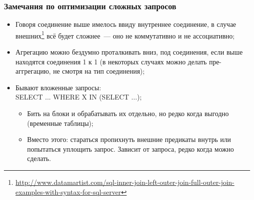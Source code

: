 \documentclass{beamer}
\begin{document}
\begin{frame}
\frametitle{Замечания по оптимизации сложных запросов}

\begin{itemize}
  \item Говоря соединение выше имелось ввиду внутреннее соединение, в случае внешних\footnote{\url{http://www.datamartist.com/sql-inner-join-left-outer-join-full-outer-join-examples-with-syntax-for-sql-server}} всё будет сложнее~--- оно не коммутативно и не ассоциативно;
  \item Агрегацию можно бездумно проталкивать вниз, под соединения, если выше находятся соединения 1 к 1 (в некоторых случаях можно делать пре-аггрегацию, не смотря на тип соединения);
  \item Бывают вложенные запросы:\\ SELECT ... WHERE X IN (SELECT ...);
  \begin{itemize}
    \item Бить на блоки и обрабатывать их отдельно, но редко когда выгодно (временные таблицы);
    \item Вместо этого: стараться пропихнуть внешние предикаты внутрь или попытаться уплощить запрос. Зависит от запроса, редко когда можно сделать.
  \end{itemize}
\end{itemize}

\end{frame}
\end{document}

